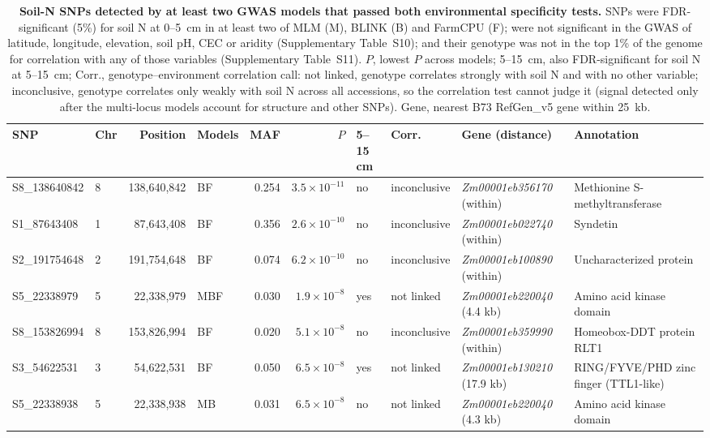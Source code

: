 \begin{table}[ht]
  \centering
  \scriptsize
  \caption{\textbf{Soil-N SNPs detected by at least two GWAS models that passed both
  environmental specificity tests.} SNPs were FDR-significant (5\%) for soil N at 0--5~cm in at
  least two of MLM (M), BLINK (B) and FarmCPU (F); were not significant in the GWAS of latitude,
  longitude, elevation, soil pH, CEC or aridity (Supplementary Table~S10); and their genotype was
  not in the top 1\% of the genome for correlation with any of those variables
  (Supplementary Table~S11). $P$, lowest $P$ across models; 5--15~cm, also FDR-significant for
  soil N at 5--15~cm; Corr., genotype--environment correlation call: not linked, genotype
  correlates strongly with soil N and with no other variable; inconclusive, genotype correlates
  only weakly with soil N across all accessions, so the correlation test cannot judge it
  (signal detected only after the multi-locus models account for structure and other SNPs).
  Gene, nearest B73 RefGen\_v5 gene within 25~kb.}
  \label{tab:soilN_specific}
  \begin{tabular}{llrlrrllll}
  \hline
  SNP & Chr & Position & Models & MAF & $P$ & 5--15 cm & Corr. & Gene (distance) & Annotation \\
  \hline
  S8\_138640842 & 8 & 138,640,842 & BF  & 0.254 & $3.5\times10^{-11}$ & no  & inconclusive & \textit{Zm00001eb356170} (within) & Methionine S-methyltransferase \\
  S1\_87643408  & 1 &  87,643,408 & BF  & 0.356 & $2.6\times10^{-10}$ & no  & inconclusive & \textit{Zm00001eb022740} (within) & Syndetin \\
  S2\_191754648 & 2 & 191,754,648 & BF  & 0.074 & $6.2\times10^{-10}$ & no  & inconclusive & \textit{Zm00001eb100890} (within) & Uncharacterized protein \\
  S5\_22338979  & 5 &  22,338,979 & MBF & 0.030 & $1.9\times10^{-8}$  & yes & not linked   & \textit{Zm00001eb220040} (4.4 kb) & Amino acid kinase domain \\
  S8\_153826994 & 8 & 153,826,994 & BF  & 0.020 & $5.1\times10^{-8}$  & no  & inconclusive & \textit{Zm00001eb359990} (within) & Homeobox-DDT protein RLT1 \\
  S3\_54622531  & 3 &  54,622,531 & BF  & 0.050 & $6.5\times10^{-8}$  & yes & not linked   & \textit{Zm00001eb130210} (17.9 kb) & RING/FYVE/PHD zinc finger (TTL1-like) \\
  S5\_22338938  & 5 &  22,338,938 & MB  & 0.031 & $6.5\times10^{-8}$  & no  & not linked   & \textit{Zm00001eb220040} (4.3 kb) & Amino acid kinase domain \\

\end{tabular}
\end{table}

